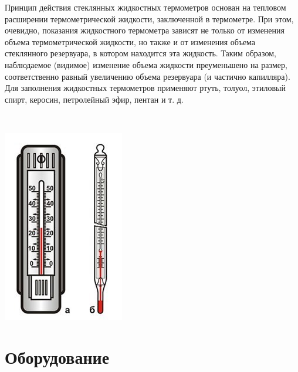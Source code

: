 \begin{minipage}{0.45\textwidth} 
Принцип действия стеклянных жидкостных термометров основан на тепловом расширении термометрической жидкости, заключенной в термометре. При этом, очевидно, показания жидкостного термометра зависят не только от изменения объема термометрической жидкости, но также и от изменения объема стеклянного резервуара, в котором находится эта жидкость. Таким образом, наблюдаемое (видимое) изменение объема жидкости преуменьшено на размер, соответственно равный увеличению объема резервуара (и частично капилляра). Для заполнения жидкостных термометров применяют ртуть, толуол, этиловый спирт, керосин, петролейный эфир, пентан и т. д.\\
\end{minipage}
\begin{minipage}{0.07\textwidth}
\
\end{minipage}
\begin{minipage}{0.45\textwidth}
\includegraphics[width=0.7\linewidth]{3.jpeg}\\
\end{minipage}

\section{Оборудование}

